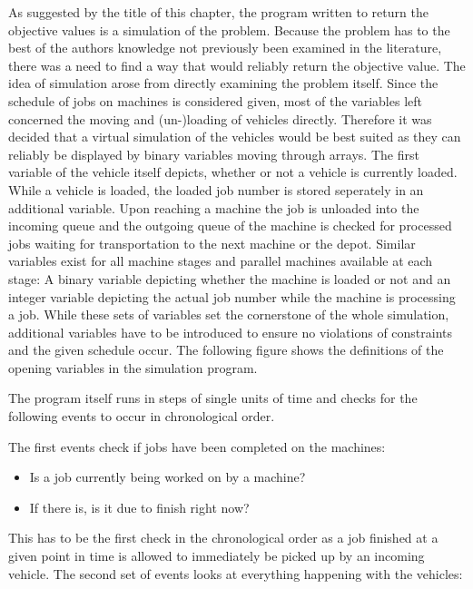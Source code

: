 As suggested by the title of this chapter, the program written to return the objective values is a simulation of the problem. Because the problem
has to the best of the authors knowledge not previously been examined in the literature, there was a need to find a way that would reliably return
the objective value. The idea of simulation arose from directly examining the problem itself. Since the schedule of jobs on machines is considered
given, most of the variables left concerned the moving and (un-)loading of vehicles directly. Therefore it was decided that a virtual simulation of
the vehicles would be best suited as they can reliably be displayed by binary variables moving through arrays. The first variable of the vehicle
itself depicts, whether or not a vehicle is currently loaded. While a vehicle is loaded, the loaded job number is stored seperately in an additional
variable. Upon reaching a machine the job is unloaded into the incoming queue and the outgoing queue of the machine is checked for processed jobs
waiting for transportation to the next machine or the depot. Similar variables exist for all machine stages and parallel machines available at each
stage: A binary variable depicting whether the machine is loaded or not and an integer variable depicting the actual job number while the machine
is processing a job. While these sets of variables set the cornerstone of the whole simulation, additional variables have to be introduced to ensure
no violations of constraints and the given schedule occur. The following figure shows the definitions of the opening variables in the simulation program.

The program itself runs in steps of single units of time and checks for the following events to occur in chronological order.

The first events check if jobs have been completed on the machines:

\begin{itemize}
\item Is a job currently being worked on by a machine?

\item If there is, is it due to finish right now?
\end{itemize}

This has to be the first check in the chronological order as a job finished at a given point in time is allowed to immediately be picked up by an
incoming vehicle. The second set of events looks at everything happening with the vehicles:

